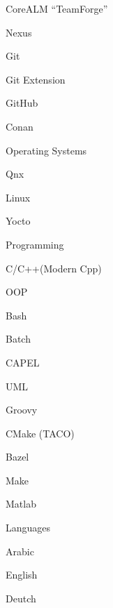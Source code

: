 \begin{cvskills}
{            \item CoreALM “TeamForge”
            \item Nexus
            \item Git
            \item Git Extension
            \item GitHub
            \item Conan
        }
  \cvskill
    {\normalsize Operating Systems} %
        {
            \item Qnx
            \item Linux
            \item Yocto
        }
  \cvskill
    {\normalsize Programming} %
        {
            \item C/C++(Modern Cpp)
            \item OOP
            \item Bash
            \item Batch
            \item CAPEL
            \item UML
            \item Groovy
            \item CMake (TACO)
            \item Bazel
            \item Make
            \item Matlab
        }
  \cvskill
    {\normalsize Languages} %
        {
            \item Arabic\item English\item Deutch
        }

\end{cvskills}
